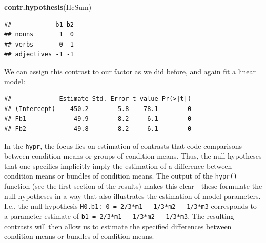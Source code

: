 \documentclass[12pt,]{krantz}
\newenvironment{Shaded}{\begin{snugshade}}{\end{snugshade}}
\newcommand{\DataTypeTok}[1]{\textcolor[rgb]{0.13,0.29,0.53}{#1}}
\newcommand{\DecValTok}[1]{\textcolor[rgb]{0.00,0.00,0.81}{#1}}
\newcommand{\KeywordTok}[1]{\textcolor[rgb]{0.13,0.29,0.53}{\textbf{#1}}}
\newcommand{\NormalTok}[1]{#1}
\newcommand{\OperatorTok}[1]{\textcolor[rgb]{0.81,0.36,0.00}{\textbf{#1}}}
\newcommand{\StringTok}[1]{\textcolor[rgb]{0.31,0.60,0.02}{#1}}
\begin{document}
\begin{Shaded}
\begin{Highlighting}[]
\KeywordTok{contr.hypothesis}\NormalTok{(HcSum)}
\end{Highlighting}
\end{Shaded}

\begin{verbatim}
##            b1 b2
## nouns       1  0
## verbs       0  1
## adjectives -1 -1
\end{verbatim}

We can assign this contrast to our factor as we did before, and again fit a linear model:

\begin{Shaded}
\end{Shaded}

\begin{Shaded}
\end{Shaded}

\begin{verbatim}
##             Estimate Std. Error t value Pr(>|t|)
## (Intercept)    450.2        5.8    78.1        0
## Fb1            -49.9        8.2    -6.1        0
## Fb2             49.8        8.2     6.1        0
\end{verbatim}

In the \texttt{hypr}, the focus lies on estimation of contrasts that code comparisons between condition means or groups of condition means. Thus, the null hypotheses that one specifies implicitly imply the estimation of a difference between condition means or bundles of condition means. The output of the \texttt{hypr()} function (see the first section of the results) makes this clear - these formulate the null hypotheses in a way that also illustrates the estimation of model parameters. I.e., the null hypothesis \texttt{H0.b1:\ 0\ =\ 2/3*m1\ -\ 1/3*m2\ -\ 1/3*m3} corresponds to a parameter estimate of \texttt{b1\ =\ 2/3*m1\ -\ 1/3*m2\ -\ 1/3*m3}. The resulting contrasts will then allow us to estimate the specified differences between condition means or bundles of condition means.
\end{document}
